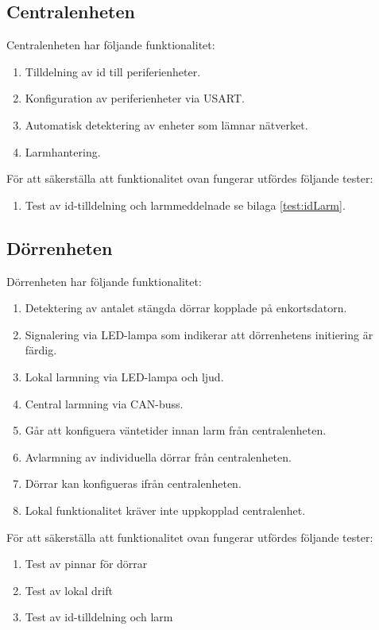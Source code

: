 \documentclass{article}
\begin{document}
 \subsection{Centralenheten}
 Centralenheten har följande funktionalitet:
 \begin{enumerate}
     \item Tilldelning av id till periferienheter.
     \item Konfiguration av periferienheter via USART.
     \item Automatisk detektering av enheter som lämnar nätverket.
     \item Larmhantering.
 \end{enumerate}
 För att säkerställa att funktionalitet ovan fungerar utfördes följande tester:
 \begin{enumerate}
     \item Test av id-tilldelning och larmmeddelnade se bilaga \ref{test:idLarm}.
 \end{enumerate}
 
 \subsection{Dörrenheten}
 Dörrenheten har följande funktionalitet:
 \begin{enumerate}
     \item Detektering av antalet stängda dörrar kopplade på enkortsdatorn.
     \item Signalering via LED-lampa som indikerar att dörrenhetens initiering är färdig.
     \item Lokal larmning via LED-lampa och ljud.
     \item Central larmning via CAN-buss.
     \item Går att konfiguera väntetider innan larm från centralenheten.
     \item Avlarmning av individuella dörrar från centralenheten.
     \item Dörrar kan konfigueras ifrån centralenheten.
     \item Lokal funktionalitet kräver inte uppkopplad centralenhet.

 \end{enumerate}
 För att säkerställa att funktionalitet ovan fungerar utfördes följande tester:
 \begin{enumerate}
     \item Test av pinnar för dörrar
     \item Test av lokal drift
     \item Test av id-tilldelning och larm
 \end{enumerate}
\end{document}

